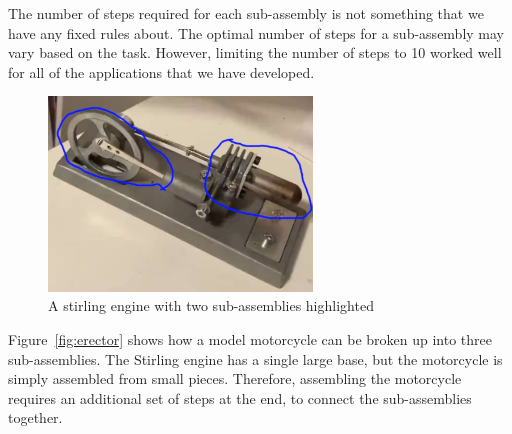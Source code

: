 The number of steps required for each sub-assembly is not something that we have
any fixed rules about.
The optimal number of steps for a sub-assembly may vary based on the task.
However, limiting the number of steps to 10 worked well for all of the
applications that we have developed.

\begin{figure}
  \includegraphics[width=7cm]{figures/stirling/full.png}
  \caption{
    A stirling engine with two sub-assemblies highlighted
  }\label{fig:stirling_full}
\end{figure}

Figure~\ref{fig:erector} shows how a model motorcycle can be broken up into
three sub-assemblies.
The Stirling engine has a single large base, but the motorcycle is simply
assembled from small pieces. Therefore, assembling the motorcycle requires
an additional set of steps at the end, to connect the sub-assemblies together.

